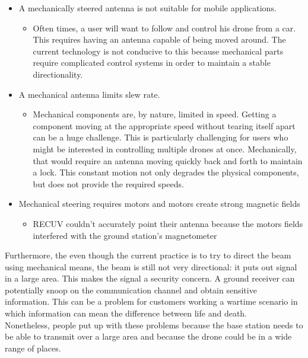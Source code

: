 \documentclass[11pt]{article}
\numberwithin{figure}{section}
\begin{document}
	\begin{itemize}
		\item A mechanically steered antenna is not suitable for mobile applications.
		\begin{itemize}
			\item Often times, a user will want to follow and control his drone from a car. This requires having an antenna capable of being moved around. The current technology is not conducive to this because mechanical parts require complicated control systems in order to maintain a stable directionality.
		\end{itemize}
		\item A mechanical antenna limits slew rate.
		\begin{itemize}
			\item Mechanical components are, by nature, limited in speed. Getting a component moving at the appropriate speed without tearing itself apart can be a huge challenge. This is particularly challenging for users who might be interested in controlling multiple drones at once. Mechanically, that would require an antenna moving quickly back and forth to maintain a lock. This constant motion not only degrades the physical components, but does not provide the required speeds.
		\end{itemize}
		\item Mechanical steering requires motors and motors create strong magnetic fields
		\begin{itemize}
			\item RECUV couldn’t accurately point their antenna because the motors fields interfered with the ground station’s magnetometer
		\end{itemize}
	\end{itemize}
		
	Furthermore, the even though the current practice is to try to direct the beam using mechanical means, the beam is still not very directional: it puts out signal in a large area. This makes the signal a security concern. A ground receiver can potentially snoop on the communication channel and obtain sensitive information.  This can be a problem for customers working a wartime scenario in which information can mean the difference between life and death.  \\

	Nonetheless, people put up with these problems because the base station needs to be able to transmit over a large area and because the drone could be in a wide range of places. \\
\end{document}
